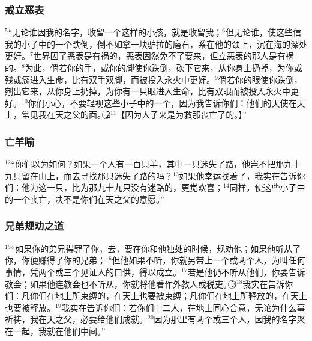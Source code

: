\subsubsection{戒立恶表}
$^{5}$“无论谁因我的名字，收留一个这样的小孩，就是收留我；$^{6}$但无论谁，使这些信我的小子中的一个跌倒，倒不如拿一块驴拉的磨石，系在他的颈上，沉在海的深处更好。$^{7}$世界因了恶表是有祸的，恶表固然免不了要来，但立恶表的那人是有祸的。$^{8}$为此，倘若你的手，或你的脚使你跌倒，砍下它来，从你身上扔掉，为你或残或瘸进入生命，比有双手双脚，而被投入永火中更好。$^{9}$倘若你的眼使你跌倒，剜出它来，从你身上扔掉，为你有一只眼进入生命，比有双眼而被投入永火中更好。$^{10}$你们小心，不要轻视这些小子中的一个，因为我告诉你们：他们的天使在天上，常见我在天之父的面。\textcircled{2}$^{11}$【因为人子来是为救那丧亡了的。】”


\subsubsection{亡羊喻}
$^{12}$“你们以为如何？如果一个人有一百只羊，其中一只迷失了路，他岂不把那九十九只留在山上，而去寻找那只迷失了路的吗？$^{13}$如果他幸运找着了，我实在告诉你们：他为这一只，比为那九十九只没有迷路的，更觉欢喜；$^{14}$同样，使这些小子中的一个丧亡，决不是你们在天之父的意愿。”


\subsubsection{兄弟规劝之道}
$^{15}$“如果你的弟兄得罪了你，去，要在你和他独处的时候，规劝他；如果他听从了你，你便赚得了你的兄弟；$^{16}$但他如果不听，你就另带上一个或两个人，为叫任何事情，凭两个或三个见证人的口供，得以成立。$^{17}$若是他仍不听从他们，你要告诉教会；如果他连教会也不听从，你就将他看作外教人或税吏。\textcircled{3}$^{18}$我实在告诉你们：凡你们在地上所束缚的，在天上也要被束缚；凡你们在地上所释放的，在天上也要被释放。$^{19}$我实在告诉你们：若你们中二人，在地上同心合意，无论为什么事祈祷，我在天之父，必要给他们成就。$^{20}$因为那里有两个或三个人，因我的名字聚在一起，我就在他们中间。”


